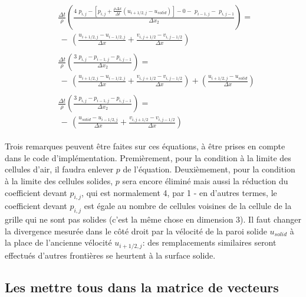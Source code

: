 \documentclass[11pt]{report}
\begin{document}
\begin{eqnarray}
&\begin{array}{c}
 \frac{\Delta t}{\rho}
\left(
	 \frac{4 \,\, p_{i,j} - 
	 \left[ 
	 	p_{i,j} + \frac{\rho\Delta x}{\Delta t}
	 	\left(
	 		u_{i+1/2,j} - u_{solid}
	 	\right)
	 \right] 
	 - 0- \,\, p_{i-1,j} - \,\, p_{i,j-1}}
	 {\Delta x_2}
\right) = \\ \, - \,	 
\left(
	\frac{u_{i+1/2,j} - u_{i-1/2,j}}
	{\Delta x} + 
	\frac{v_{i,j+1/2} - v_{i,j-1/2}}
	{\Delta x}
\right)
\end{array} \\
&\begin{array}{c}
\frac{\Delta t}{\rho}
\left(
	 \frac{3 \,\, p_{i,j} - p_{i-1,j} - p_{i,j-1}}
	 {\Delta x_2}
\right) = \\ \, - \,	 
\left(
	\frac{u_{i+1/2,j} - u_{i-1/2,j}}
	{\Delta x} + 
	\frac{v_{i,j+1/2} - v_{i,j-1/2}}
	{\Delta x}
\right) +
\left(
	\frac{u_{i+1/2,j} - u_{solid}}{\Delta x}
\right)
\end{array}\\
&\begin{array}{c}
\frac{\Delta t}{\rho}
\left(
	 \frac{3 \,\, p_{i,j} - p_{i-1,j} - p_{i,j-1}}
	 {\Delta x_2}
\right) = \\ \, - \,	 
\left(
	\frac{u_{solid} - u_{i-1/2,j}}
	{\Delta x} + 
	\frac{v_{i,j+1/2} - v_{i,j-1/2}}
	{\Delta x}
\right)
\end{array}
\end{eqnarray}

Trois remarques peuvent être faites sur ces équations, à être prises en compte dans le code d'implémentation. Premièrement, pour la condition à la limite des cellules d'air, il faudra enlever $p$ de l'équation. Deuxièmement, pour la condition à la limite des cellules solides, $p$ sera encore éliminé mais aussi la réduction du coefficient devant $p_{i,j}$, qui est normalement 4, par 1 - en d'autres termes, le coefficient devant $p_{i,j}$ est égale au nombre de cellules voisines de la cellule de la grille qui ne sont pas solides (c'est la même chose en dimension 3). Il faut changer la divergence mesurée dans le côté droit par la vélocité de la paroi solide $u_{solid}$ à la place de l'ancienne vélocité $u_{i+1/2,j}$: des remplacements similaires seront effectués d'autres frontières se heurtent à la surface solide.

\subsection{Les mettre tous dans la matrice de vecteurs}
\end{document}
